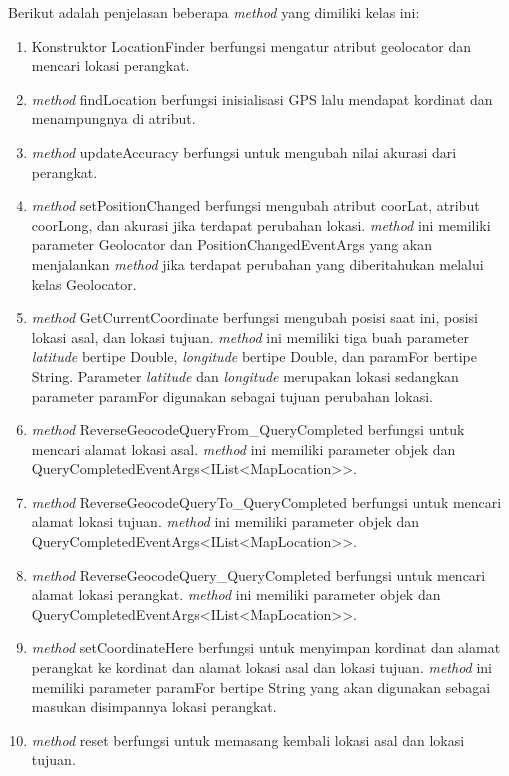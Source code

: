 Berikut adalah penjelasan beberapa \textit{method} yang dimiliki kelas ini:
\begin{enumerate}
	\item Konstruktor LocationFinder berfungsi mengatur atribut geolocator dan mencari lokasi perangkat.
	\item \textit{method} findLocation berfungsi inisialisasi GPS lalu mendapat kordinat dan menampungnya di atribut.
	\item \textit{method} updateAccuracy berfungsi untuk mengubah nilai akurasi dari perangkat.
	\item \textit{method} setPositionChanged berfungsi mengubah atribut coorLat, atribut coorLong, dan akurasi jika terdapat perubahan lokasi. \textit{method} ini memiliki parameter Geolocator dan PositionChangedEventArgs yang akan menjalankan \textit{method} jika terdapat perubahan yang diberitahukan melalui kelas Geolocator.
	\item \textit{method} GetCurrentCoordinate berfungsi mengubah posisi saat ini, posisi lokasi asal, dan lokasi tujuan. \textit{method} ini memiliki tiga buah parameter \textit{latitude} bertipe Double, \textit{longitude} bertipe Double, dan paramFor bertipe String. Parameter \textit{latitude} dan \textit{longitude} merupakan lokasi sedangkan parameter paramFor digunakan sebagai tujuan perubahan lokasi. 
	\item \textit{method} ReverseGeocodeQueryFrom\_QueryCompleted berfungsi untuk mencari alamat lokasi asal. \textit{method} ini memiliki parameter objek dan QueryCompletedEventArgs<IList<MapLocation>>.
	\item \textit{method} ReverseGeocodeQueryTo\_QueryCompleted berfungsi untuk mencari alamat lokasi tujuan. \textit{method} ini memiliki parameter objek dan QueryCompletedEventArgs<IList<MapLocation>>.
	\item \textit{method} ReverseGeocodeQuery\_QueryCompleted berfungsi untuk mencari alamat lokasi perangkat. \textit{method} ini memiliki parameter objek dan QueryCompletedEventArgs<IList<MapLocation>>.
	\item \textit{method} setCoordinateHere berfungsi untuk menyimpan kordinat dan alamat perangkat ke kordinat dan alamat lokasi asal dan lokasi tujuan. \textit{method} ini memiliki parameter paramFor bertipe String yang akan digunakan sebagai masukan disimpannya lokasi perangkat.
	\item \textit{method} reset berfungsi untuk memasang kembali lokasi asal dan lokasi tujuan.
\end{enumerate}

